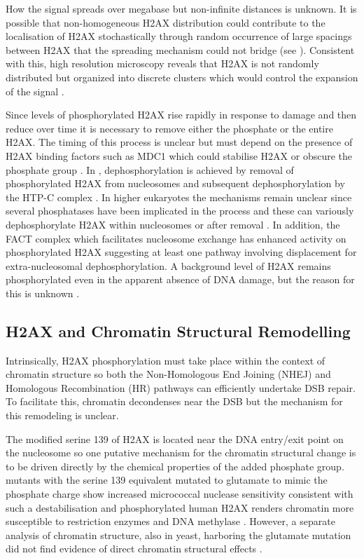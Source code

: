 How the signal spreads over megabase but non-infinite distances is
unknown. It is possible that non-homogeneous H2AX distribution could
contribute to the localisation of \textgamma H2AX stochastically
through random occurrence of large spacings between H2AX that the
spreading mechanism could not bridge (see
). Consistent with this,
high resolution microscopy reveals that H2AX is not randomly
distributed but organized into discrete clusters which would control
the expansion of the signal \citep{JBBTB06}.

Since levels of phosphorylated H2AX rise rapidly in response to damage
and then reduce over time \citep{EPR+98} it is necessary to remove
either the phosphate or the entire \textgamma H2AX\@. The timing of
this process is unclear but must depend on the presence of \textgamma
H2AX binding factors such as MDC1 which could stabilise \textgamma
H2AX or obscure the phosphate group \citep{MSJAC+05}. In
, dephosphorylation is achieved by removal of
phosphorylated H2AX from nucleosomes and subsequent dephosphorylation
by the HTP-C complex \citep{MKJK+06}. In higher eukaryotes the
mechanisms remain unclear since several phosphatases have been
implicated in the process and these can variously dephosphorylate H2AX
within nucleosomes or after removal \citep{CKI+05,KTA+06,CXZ+08}. In
addition, the FACT complex which facilitates nucleosome exchange has
enhanced activity on phosphorylated H2AX \citep{KHHK+08} suggesting at
least one pathway involving displacement for extra-nucleosomal
dephosphorylation. A background level of H2AX remains phosphorylated
even in the apparent absence of DNA damage, but the reason for this is
unknown \citep{EPR+98}.

\subsection{\textgamma H2AX and Chromatin Structural Remodelling}
Intrinsically, H2AX phosphorylation must take place within the context
of chromatin structure so both the Non-Homologous End Joining (NHEJ)
and Homologous Recombination (HR) pathways can efficiently undertake
DSB repair. To facilitate this, chromatin decondenses near the DSB
\citep{MJK+06} but the mechanism for this remodeling is unclear.

The modified serine 139 of H2AX is located near the DNA entry/exit
point on the nucleosome  so
one putative mechanism for the chromatin structural change is to be
driven directly by the chemical properties of the added phosphate
group.  mutants with the serine 139 equivalent
mutated to glutamate to mimic the phosphate charge show increased
micrococcal nuclease sensitivity consistent with such a
destabilisation \citep{JAD00} and phosphorylated human H2AX renders
chromatin more susceptible to restriction enzymes and DNA methylase
\citep{KHHK+08}. However, a separate analysis of chromatin structure,
also in yeast, harboring the glutamate mutation did not find evidence
of direct chromatin structural effects \citep{FIT07}.

